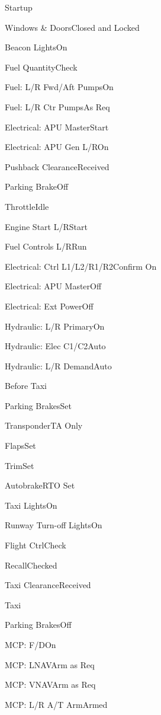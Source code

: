 \documentclass[sim-use]{checklist}
\begin{document}
\begin{checklist}{Startup}
  \item{Windows \& Doors}{Closed and Locked}
  \item{Beacon Lights}{On}
  \item{Fuel Quantity}{Check}
  \item{Fuel: L/R Fwd/Aft Pumps}{On}
  \item{Fuel: L/R Ctr Pumps}{As Req}
  \item{Electrical: APU Master}{Start}
  \item{Electrical: APU Gen L/R}{On}
  \item{Pushback Clearance}{Received}
  \item{Parking Brake}{Off}
  \item{Throttle}{Idle}
  \item{Engine Start L/R}{Start}
  \item{Fuel Controls L/R}{Run}
  \item{Electrical: Ctrl L1/L2/R1/R2}{Confirm On}
  \item{Electrical: APU Master}{Off}
  \item{Electrical: Ext Power}{Off}
  \item{Hydraulic: L/R Primary}{On}
  \item{Hydraulic: Elec C1/C2}{Auto}
  \item{Hydraulic: L/R Demand}{Auto}
\end{checklist}

\begin{checklist}{Before Taxi}
  \item{Parking Brakes}{Set}
  \item{Transponder}{TA Only}
  \item{Flaps}{Set}
  \item{Trim}{Set}
  \item{Autobrake}{RTO Set}
  \item{Taxi Lights}{On}
  \item{Runway Turn-off Lights}{On}
  \item{Flight Ctrl}{Check}
  \item{Recall}{Checked}
  \item{Taxi Clearance}{Received}
\end{checklist}

\begin{checklist}{Taxi}
  \item{Parking Brakes}{Off}
  \item{MCP: F/D}{On}
  \item{MCP: LNAV}{Arm as Req}
  \item{MCP: VNAV}{Arm as Req}
  \item{MCP: L/R A/T Arm}{Armed}
\end{checklist}
\end{document}
